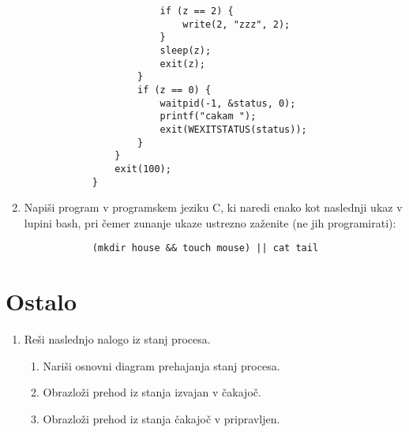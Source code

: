 \documentclass{book}
\begin{document}
\begin{enumerate}
\begin{verbatim}
                        if (z == 2) {
                            write(2, "zzz", 2);
                        }
                        sleep(z);
                        exit(z);
                    }
                    if (z == 0) {
                        waitpid(-1, &status, 0);
                        printf("cakam ");
                        exit(WEXITSTATUS(status));
                    }
                }
                exit(100);
            }
        \end{verbatim}
    \item Napiši program v programskem jeziku C, ki naredi enako kot naslednji ukaz v lupini bash, pri čemer zunanje ukaze ustrezno zaženite (ne jih programirati):
        \begin{verbatim}
            (mkdir house && touch mouse) || cat tail
        \end{verbatim}
\end{enumerate}

\section{Ostalo}
\begin{enumerate}
    \item Reši naslednjo nalogo iz stanj procesa.
        \begin{enumerate}
            \item Nariši osnovni diagram prehajanja stanj procesa. 
            \item Obrazloži prehod iz stanja izvajan v čakajoč. 
            \item Obrazloži prehod iz stanja čakajoč v pripravljen.
        \end{enumerate}
\end{enumerate}
\end{document}
